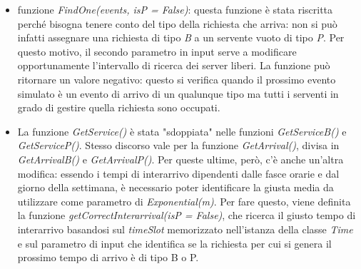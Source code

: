 \documentclass[a4paper, 12pt]{article}
\begin{document}
\begin{itemize}
  \item funzione \emph{FindOne(events, isP = False)}: questa funzione è stata
riscritta perché bisogna tenere conto del tipo della richiesta che arriva: non
si può infatti assegnare una richiesta di tipo \emph{B} a un servente vuoto di tipo
\emph{P}. Per questo motivo, il secondo parametro in input serve a modificare
opportunamente l'intervallo di ricerca dei server liberi. La funzione può
ritornare un valore negativo: questo si verifica quando il prossimo evento
simulato è un evento di arrivo di un qualunque tipo ma tutti i serventi in
grado di gestire quella richiesta sono occupati.

  \item La funzione \emph{GetService()} è stata "sdoppiata" nelle funzioni
\emph{GetServiceB()} e \emph{GetServiceP()}. Stesso discorso vale per la funzione
\emph{GetArrival()}, divisa in \emph{GetArrivalB()} e \emph{GetArrivalP()}. Per queste ultime,
però, c'è anche un'altra modifica: essendo i tempi di interarrivo dipendenti
dalle fasce orarie e dal giorno della settimana, è necessario poter 
identificare la giusta media da utilizzare come parametro di \emph{Exponential(m)}.
Per fare questo, viene definita la funzione \emph{getCorrectInterarrival(isP
= False)}, che ricerca il giusto tempo di interarrivo basandosi sul \emph{timeSlot}
memorizzato nell'istanza della classe \emph{Time} e sul parametro di input che
identifica se la richiesta per cui si genera il prossimo tempo di arrivo è di
tipo B o P.
\end{itemize}

\newpage
\end{document}
